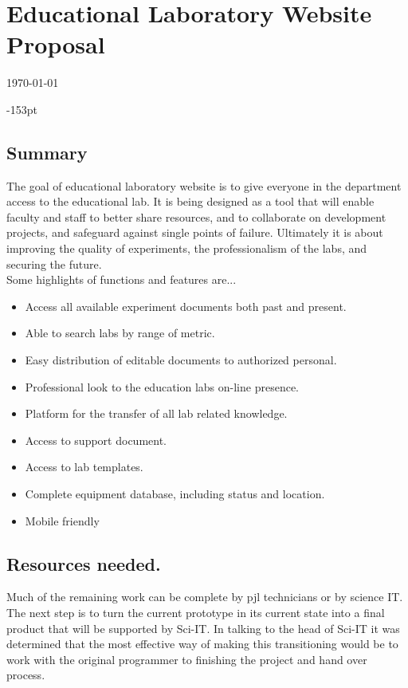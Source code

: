 



\chapter{\bf Educational Laboratory Website Proposal}
\vspace{-1.5cm}
\today
\begin{adjustwidth}{}{-153pt}

\section{\bf Summary}
The goal of educational laboratory website is to give everyone in the department access to the educational lab. It is being designed as a tool that will enable faculty and staff to better share resources, and to collaborate on development projects, and safeguard against single points of failure. Ultimately it is about improving the quality of experiments, the professionalism of the labs, and securing the future. \\

Some highlights of functions and features are...

\begin{itemize}
\item Access all available experiment documents both past and present.
\item Able to search labs by range of metric.
\item Easy distribution of editable documents to authorized personal.
\item Professional look to the education labs on-line presence.
\item Platform for the transfer of all lab related knowledge.
\item Access to support document.
\item Access to lab templates.
\item Complete equipment database, including status and location.
\item Mobile friendly
\end{itemize}


\section{\bf Resources needed.}

Much of the remaining work can be complete by pjl technicians or by science IT. The next step is to turn the current prototype in its current state into a final product that will be supported by Sci-IT. In talking to the head of Sci-IT it was determined that the most effective way of making this transitioning would be to work with the original programmer to finishing the project and hand over process. \\ 


\end{adjustwidth}
